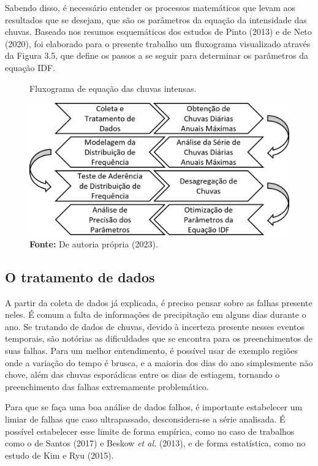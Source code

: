 Sabendo disso, é necessário entender os processos matemáticos que levam aos resultados que se desejam, que são os parâmetros da equação da intensidade das chuvas. Baseado nos resumos esquemáticos dos estudos de Pinto (2013) e de Neto (2020), foi elaborado para o presente trabalho um fluxograma visualizado através da Figura 3.5, que define os passos a se seguir para determinar os parâmetros da equação IDF.\bigskip

\begin{figure}[!ht]
	\centering
	\caption{Fluxograma de equação das chuvas intensas.}
	\includegraphics[width=.7625\linewidth]{figuras/fluxograma_de_equacao_idf.png}
	\caption*{\textbf{Fonte:} De autoria própria (2023).}
	\label{fig:fluxograma_de_equacao_idf.png}
\end{figure}

\subsection{O tratamento de dados}

A partir da coleta de dados já explicada, é preciso pensar sobre as falhas presente neles. É comum a falta de informações de precipitação em alguns dias durante o ano. Se tratando de dados de chuvas, devido à incerteza presente nesses eventos temporais, são notórias as dificuldades que se encontra para os preenchimentos de suas falhas. Para um melhor entendimento, é possível usar de exemplo regiões onde a variação do tempo é brusca, e a maioria dos dias do ano simplesmente não chove, além das chuvas esporádicas entre os dias de estiagem, tornando o preenchimento das falhas extremamente problemático. 

Para que se faça uma boa análise de dados falhos, é importante estabelecer um limiar de falhas que caso ultrapassado, desconsidera-se a série analisada. É possível estabelecer esse limite de forma empírica, como no caso de trabalhos como o de Santos (2017) e Beskow \textit{et al.} (2013), e de forma estatística, como no estudo de Kim e Ryu (2015).

